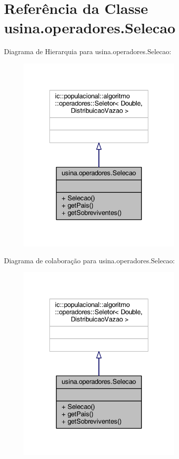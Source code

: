 \hypertarget{classusina_1_1operadores_1_1_selecao}{\section{Referência da Classe usina.\-operadores.\-Selecao}
\label{classusina_1_1operadores_1_1_selecao}
}


Diagrama de Hierarquia para usina.\-operadores.\-Selecao\-:\nopagebreak
\begin{figure}[H]
\begin{center}
\leavevmode
\includegraphics[width=228pt]{classusina_1_1operadores_1_1_selecao__inherit__graph}
\end{center}
\end{figure}


Diagrama de colaboração para usina.\-operadores.\-Selecao\-:\nopagebreak
\begin{figure}[H]
\begin{center}
\leavevmode
\includegraphics[width=228pt]{classusina_1_1operadores_1_1_selecao__coll__graph}
\end{center}
\end{figure}
